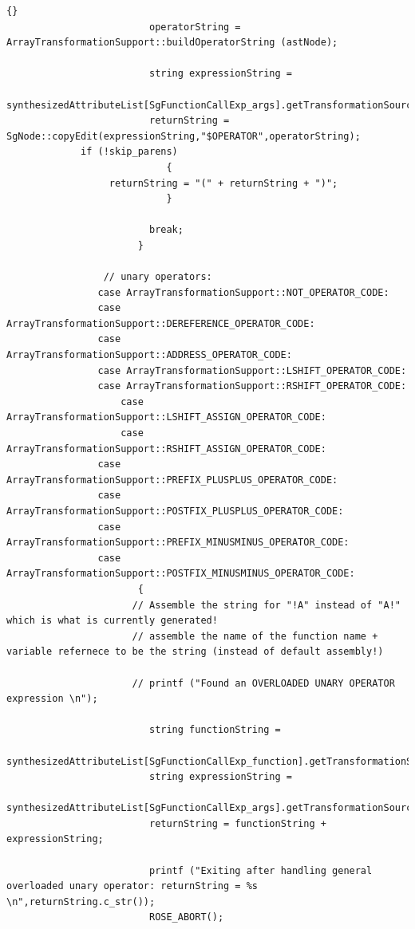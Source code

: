 \documentclass[10pt]{article}
\begin{document}
{\begin{lstlisting}{}
                         operatorString = ArrayTransformationSupport::buildOperatorString (astNode);

                         string expressionString =
                              synthesizedAttributeList[SgFunctionCallExp_args].getTransformationSourceCode();
                         returnString = SgNode::copyEdit(expressionString,"$OPERATOR",operatorString);
			 if (!skip_parens)
                            {
			      returnString = "(" + returnString + ")";
                            }

                         break;
                       }

                 // unary operators:
	            case ArrayTransformationSupport::NOT_OPERATOR_CODE:
	            case ArrayTransformationSupport::DEREFERENCE_OPERATOR_CODE:
	            case ArrayTransformationSupport::ADDRESS_OPERATOR_CODE:
	            case ArrayTransformationSupport::LSHIFT_OPERATOR_CODE:
	            case ArrayTransformationSupport::RSHIFT_OPERATOR_CODE:
                    case ArrayTransformationSupport::LSHIFT_ASSIGN_OPERATOR_CODE:
                    case ArrayTransformationSupport::RSHIFT_ASSIGN_OPERATOR_CODE:
	            case ArrayTransformationSupport::PREFIX_PLUSPLUS_OPERATOR_CODE:
	            case ArrayTransformationSupport::POSTFIX_PLUSPLUS_OPERATOR_CODE:
	            case ArrayTransformationSupport::PREFIX_MINUSMINUS_OPERATOR_CODE:
	            case ArrayTransformationSupport::POSTFIX_MINUSMINUS_OPERATOR_CODE:
                       {
                      // Assemble the string for "!A" instead of "A!" which is what is currently generated!
                      // assemble the name of the function name + variable refernece to be the string (instead of default assembly!) 

                      // printf ("Found an OVERLOADED UNARY OPERATOR expression \n");

                         string functionString = 
                              synthesizedAttributeList[SgFunctionCallExp_function].getTransformationSourceCode();
                         string expressionString = 
                              synthesizedAttributeList[SgFunctionCallExp_args].getTransformationSourceCode();
                         returnString = functionString + expressionString;

                         printf ("Exiting after handling general overloaded unary operator: returnString = %s \n",returnString.c_str());
                         ROSE_ABORT();


\end{lstlisting}}
\end{document}
